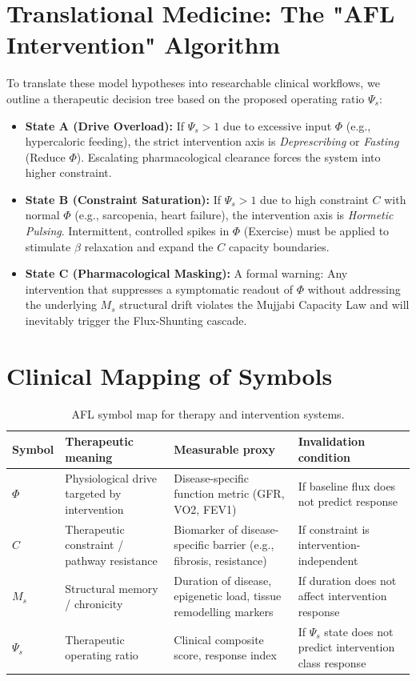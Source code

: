 \documentclass[12pt,a4paper]{article}
\begin{document}
\section{Translational Medicine: The "AFL Intervention" Algorithm}
To translate these model hypotheses into researchable clinical workflows, we outline a therapeutic decision tree based on the proposed operating ratio $\Psi_s$:

\begin{itemize}
    \item \textbf{State A (Drive Overload):} If $\Psi_s > 1$ due to excessive input $\Phi$ (e.g., hypercaloric feeding), the strict intervention axis is \textit{Deprescribing} or \textit{Fasting} (Reduce $\Phi$). Escalating pharmacological clearance forces the system into higher constraint.
    \item \textbf{State B (Constraint Saturation):} If $\Psi_s > 1$ due to high constraint $C$ with normal $\Phi$ (e.g., sarcopenia, heart failure), the intervention axis is \textit{Hormetic Pulsing}. Intermittent, controlled spikes in $\Phi$ (Exercise) must be applied to stimulate $\beta$ relaxation and expand the $C$ capacity boundaries.
    \item \textbf{State C (Pharmacological Masking):} A formal warning: Any intervention that suppresses a symptomatic readout of $\Phi$ without addressing the underlying $M_s$ structural drift violates the Mujjabi Capacity Law and will inevitably trigger the Flux-Shunting cascade.
\end{itemize}

\section{Clinical Mapping of Symbols}

\begin{table}[h!]
\centering
\caption{AFL symbol map for therapy and intervention systems.}
\begin{tabular}{llll}
\toprule
\textbf{Symbol} & \textbf{Therapeutic meaning} & \textbf{Measurable proxy} & \textbf{Invalidation condition} \\
\midrule
$\Phi$ & Physiological drive targeted by intervention & Disease-specific function metric (GFR, VO2, FEV1) & If baseline flux does not predict response \\
$C$ & Therapeutic constraint / pathway resistance & Biomarker of disease-specific barrier (e.g., fibrosis, resistance) & If constraint is intervention-independent \\
$M_s$ & Structural memory / chronicity & Duration of disease, epigenetic load, tissue remodelling markers & If duration does not affect intervention response \\
$\Psi_s$ & Therapeutic operating ratio & Clinical composite score, response index & If $\Psi_s$ state does not predict intervention class response \\
\bottomrule
\end{tabular}
\end{table}
\end{document}
